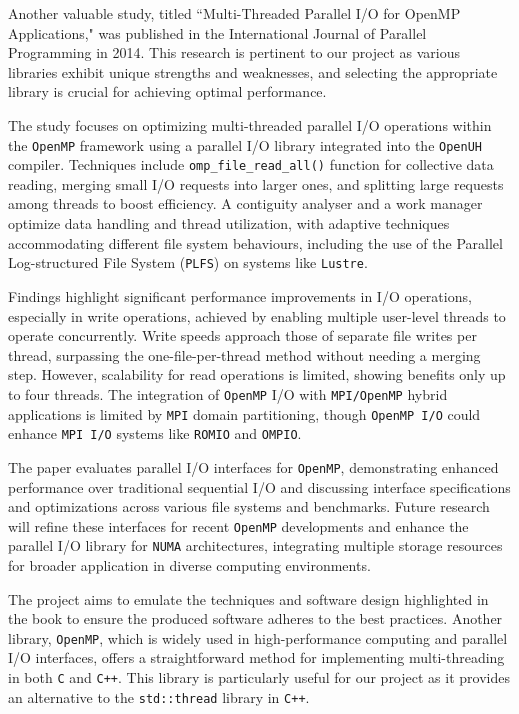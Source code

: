 Another valuable study, titled ``Multi-Threaded Parallel I/O for OpenMP Applications," was published in the International Journal of Parallel Programming in 2014\cite{openmp_usage_hpc}. This research is pertinent to our project as various libraries exhibit unique strengths and weaknesses, and selecting the appropriate library is crucial for achieving optimal performance.

The study focuses on optimizing multi-threaded parallel I/O operations within the \texttt{OpenMP} framework using a parallel I/O library integrated into the \texttt{OpenUH} compiler. Techniques include \texttt{omp\_file\_read\_all()} function for collective data reading, merging small I/O requests into larger ones, and splitting large requests among threads to boost efficiency. A contiguity analyser and a work manager optimize data handling and thread utilization, with adaptive techniques accommodating different file system behaviours, including the use of the Parallel Log-structured File System (\texttt{PLFS}) on systems like \texttt{Lustre}.

Findings highlight significant performance improvements in I/O operations, especially in write operations, achieved by enabling multiple user-level threads to operate concurrently. Write speeds approach those of separate file writes per thread, surpassing the one-file-per-thread method without needing a merging step. However, scalability for read operations is limited, showing benefits only up to four threads. The integration of \texttt{OpenMP} I/O with \texttt{MPI/OpenMP} hybrid applications is limited by \texttt{MPI} domain partitioning, though \texttt{OpenMP I/O} could enhance \texttt{MPI I/O} systems like \texttt{ROMIO} and \texttt{OMPIO}.

The paper\cite{openmp_usage_hpc} evaluates parallel I/O interfaces for \texttt{OpenMP}, demonstrating enhanced performance over traditional sequential I/O and discussing interface specifications and optimizations across various file systems and benchmarks. Future research will refine these interfaces for recent \texttt{OpenMP} developments and enhance the parallel I/O library for \texttt{NUMA} architectures, integrating multiple storage resources for broader application in diverse computing environments.

The project aims to emulate the techniques and software design highlighted in the book\cite{c++_concurrency_in_action} to ensure the produced software adheres to the best practices. Another library, \texttt{OpenMP}, which is widely used in high-performance computing and parallel I/O interfaces\cite{openmp_usage_hpc}, offers a straightforward method for implementing multi-threading in both \texttt{C} and \texttt{C++}. This library is particularly useful for our project as it provides an alternative to the \texttt{std::thread} library in \texttt{C++}. 

